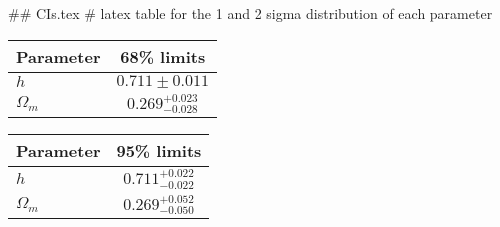 ## CIs.tex
# latex table for the 1 and 2 sigma distribution of each parameter

\begin{tabular} { l  c}
 Parameter &  68\% limits\\
\hline
{\boldmath$h              $} & $0.711\pm 0.011            $\\
{\boldmath$\Omega_m       $} & $0.269^{+0.023}_{-0.028}   $\\
\hline
\end{tabular}

\begin{tabular} { l  c}
 Parameter &  95\% limits\\
\hline
{\boldmath$h              $} & $0.711^{+0.022}_{-0.022}   $\\
{\boldmath$\Omega_m       $} & $0.269^{+0.052}_{-0.050}   $\\
\hline
\end{tabular}
